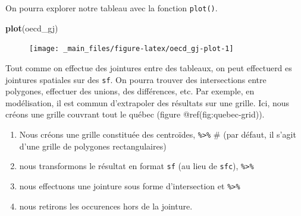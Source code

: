 \documentclass[]{book}
\newenvironment{Shaded}{\begin{snugshade}}{\end{snugshade}}
\newcommand{\CommentTok}[1]{\textcolor[rgb]{0.56,0.35,0.01}{\textit{#1}}}
\newcommand{\DataTypeTok}[1]{\textcolor[rgb]{0.13,0.29,0.53}{#1}}
\newcommand{\DecValTok}[1]{\textcolor[rgb]{0.00,0.00,0.81}{#1}}
\newcommand{\KeywordTok}[1]{\textcolor[rgb]{0.13,0.29,0.53}{\textbf{#1}}}
\newcommand{\NormalTok}[1]{#1}
\newcommand{\OperatorTok}[1]{\textcolor[rgb]{0.81,0.36,0.00}{\textbf{#1}}}
\newcommand{\StringTok}[1]{\textcolor[rgb]{0.31,0.60,0.02}{#1}}
\providecommand{\tightlist}{%
  \setlength{\itemsep}{0pt}\setlength{\parskip}{0pt}}
\begin{document}
On pourra explorer notre tableau avec la fonction \texttt{plot()}.

\begin{Shaded}
\begin{Highlighting}[]
\KeywordTok{plot}\NormalTok{(oecd_gj)}
\end{Highlighting}
\end{Shaded}

\begin{figure}

{\centering \texttt{[image: \_main\_files/figure-latex/oecd\_gj-plot-1]} 

}

\caption{ }\label{fig:oecd_gj-plot}
\end{figure}

Tout comme on effectue des jointures entre des tableaux, on peut
effectuerd es jointures spatiales sur des \texttt{sf}. On pourra trouver
des intersections entre polygones, effectuer des unions, des
différences, etc. Par exemple, en modélisation, il est commun
d'extrapoler des résultats sur une grille. Ici, nous créons une grille
couvrant tout le québec (figure @ref(fig:quebec-grid)).

\begin{enumerate}
\def\labelenumi{\arabic{enumi}.}
\tightlist
\item
  Nous créons une grille constituée des centroïdes,
  \texttt{\%\textgreater{}\%} \# (par défaut, il s'agit d'une grille de
  polygones rectangulaires)
\item
  nous transformons le résultat en format \texttt{sf} (au lieu de
  \texttt{sfc}), \texttt{\%\textgreater{}\%}
\item
  nous effectuons une jointure sous forme d'intersection et
  \texttt{\%\textgreater{}\%}
\item
  nous retirons les occurences hors de la jointure.
\end{enumerate}

\begin{Shaded}
\end{Shaded}
\end{document}
